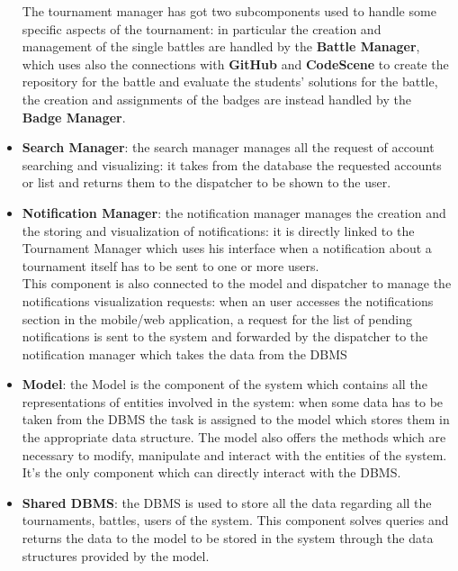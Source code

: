 \documentclass{article}
\begin{document}
\begin{itemize}
    The tournament manager has got two subcomponents used to handle some specific aspects of the tournament: in particular the creation and management of the single battles are handled by the \textbf{Battle Manager}, which uses also the connections with \textbf{GitHub} and \textbf{CodeScene} to create the repository for the battle and evaluate the students' solutions for the battle, the creation and assignments of the badges are instead handled by the \textbf{Badge Manager}.
    \item \textbf{Search Manager}: the search manager manages all the request of account searching and visualizing: it takes from the database the requested accounts or list and returns them to the dispatcher to be shown to the user.
    \item \textbf{Notification Manager}: the notification manager manages the creation and the storing and visualization of notifications: it is directly linked to the Tournament Manager which uses his interface when a notification about a tournament itself has to be sent to one or more users.\\
    This component is also connected to the model and dispatcher to manage the notifications visualization requests: when an user accesses the notifications section in the mobile/web application, a request for the list of pending notifications is sent to the system and forwarded by the dispatcher to the notification manager which takes the data from the DBMS
    \item \textbf{Model}: the Model is the component of the system which contains all the representations of entities involved in the system: when some data has to be taken from the DBMS the task is assigned to the model which stores them in the appropriate data structure.
    The model also offers the methods which are necessary to modify, manipulate and interact with the entities of the system.
    It's the only component which can directly interact with the DBMS.
    \item \textbf{Shared DBMS}: the DBMS is used to store all the data regarding all the tournaments, battles, users of the system.
    This component solves queries and returns the data to the model to be stored in the system through the data structures provided by the model.
\end{itemize}
\end{document}
